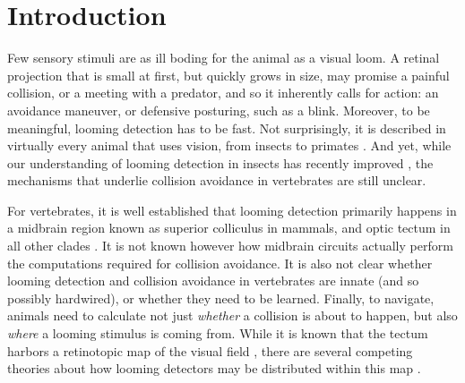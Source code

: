 \documentclass{article}
\begin{document}
\section*{Introduction}


Few sensory stimuli are as ill boding for the animal as a visual loom. A retinal projection that is small at first, but quickly grows in size, may promise a painful collision, or a meeting with a predator, and so it inherently calls for action: an avoidance maneuver, or defensive posturing, such as a blink. Moreover, to be meaningful, looming detection has to be fast. Not surprisingly, it is described in virtually every animal that uses vision, from insects to primates \citep{Pereira2016}. And yet, while our understanding of looming detection in insects has recently improved \citep{rind2016locust,von2017fruitfly}, the mechanisms that underlie collision avoidance in vertebrates are still unclear.

For vertebrates, it is well established that looming detection primarily happens in a midbrain region known as superior colliculus in mammals, and optic tectum in all other clades \citep{frost2004review, liu2011cat, khakhalin2014, dunn2016escapesZF}. It is not known however how midbrain circuits actually perform the computations required for collision avoidance. It is also not clear whether looming detection and collision avoidance in vertebrates are innate (and so possibly hardwired), or whether they need to be learned. Finally, to navigate, animals need to calculate not just \textit{whether} a collision is about to happen, but also \textit{where} a looming stimulus is coming from. While it is known that the tectum harbors a retinotopic map of the visual field \citep{mclaughlin2003retinotopic, ruthazer2004map}, there are several competing theories about how looming detectors may be distributed within this map \citep{frost2004review}.
\end{document}
